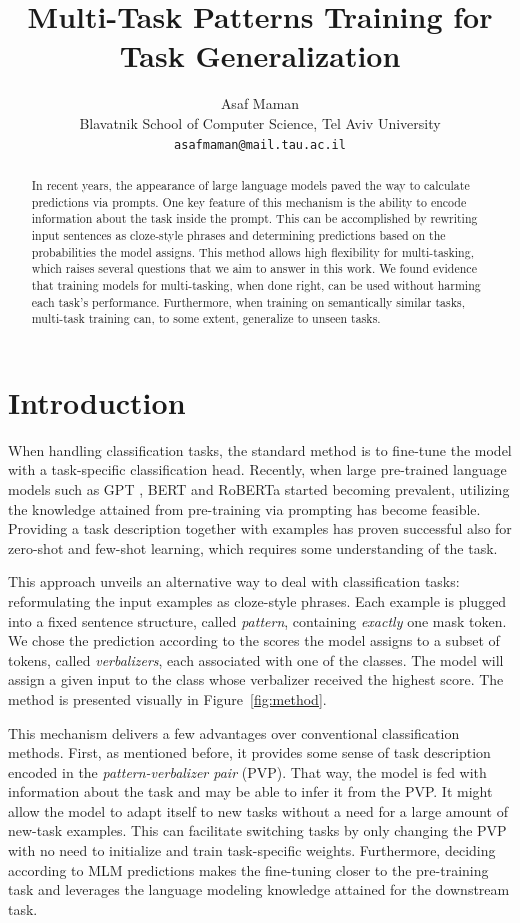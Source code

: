 \documentclass[11pt,a4paper]{article}
\title{Multi-Task Patterns Training for Task Generalization}
\author{Asaf Maman \\
  Blavatnik School of Computer Science, Tel Aviv University \\
  \texttt{asafmaman@mail.tau.ac.il} \\}
\date{}
\begin{document}
\maketitle

\begin{abstract}
In recent years, the appearance of large language models paved the way to calculate predictions via prompts.
One key feature of this mechanism is the ability to encode information about the task inside the prompt.
This can be accomplished by rewriting input sentences as cloze-style phrases and determining predictions based on the probabilities the model assigns.
This method allows high flexibility for multi-tasking, which raises several questions that we aim to answer in this work.
We found evidence that training models for multi-tasking, when done right, can be used without harming each task's performance.
Furthermore, when training on semantically similar tasks, multi-task training can, to some extent, generalize to unseen tasks.
\end{abstract}


\section{Introduction}
When handling classification tasks, the standard method is to fine-tune the model with a task-specific classification head.
Recently, when large pre-trained language models such as GPT \citep{radford2018improving}, BERT \citep{devlin2019bert} and RoBERTa \citep{liu2019roberta} started becoming prevalent, utilizing the knowledge attained from pre-training via prompting has become feasible.
Providing a task description together with examples has proven successful \citep{radford2019language} also for zero-shot and few-shot learning, which requires some understanding of the task.

This approach unveils an alternative way to deal with classification tasks: reformulating the input examples as cloze-style phrases.
Each example is plugged into a fixed sentence structure, called \textit{pattern}, containing \textit{exactly} one mask token.
We chose the prediction according to the scores the model assigns to a subset of tokens, called \textit{verbalizers}, each associated with one of the classes.
The model will assign a given input to the class whose verbalizer received the highest score.
The method is presented visually in Figure~\ref{fig:method}.

This mechanism delivers a few advantages over conventional classification methods.
First, as mentioned before, it provides some sense of task description encoded in the \textit{pattern-verbalizer pair} (PVP).
That way, the model is fed with information about the task and may be able to infer it from the PVP.
It might allow the model to adapt itself to new tasks without a need for a large amount of new-task examples.
This can facilitate switching tasks by only changing the PVP with no need to initialize and train task-specific weights.
Furthermore, deciding according to MLM predictions makes the fine-tuning closer to the pre-training task and leverages the language modeling knowledge attained for the downstream task.
\end{document}
